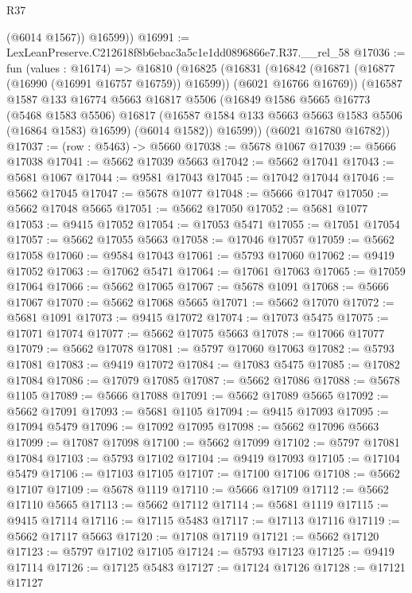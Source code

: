 \begin{lexlean}{R37}
\begin{coremodule}
          (@6014 @1567))
        @16599))
@16991 := LexLeanPreserve.C212618f8b6ebac3a5c1e1dd0896866e7.R37.__rel_58
@17036 := fun (values : @16174) =>
  @16810
    (@16825
      (@16831
        (@16842 (@16871 (@16877 (@16990 (@16991 @16757 @16759)) @16599)) (@6021 @16766 @16769))
        (@16587
          @1587
          @133
          @16774
          @5663
          @16817
          @5506
          (@16849
            @1586
            @5665
            @16773
            (@5468 @1583 @5506)
            @16817
            (@16587 @1584 @133 @5663 @5663 @1583 @5506 (@16864 @1583) @16599)
            (@6014 @1582))
          @16599))
      (@6021 @16780 @16782))
@17037 := (row : @5463) -> @5660
@17038 := @5678 @1067
@17039 := @5666 @17038
@17041 := @5662 @17039 @5663
@17042 := @5662 @17041
@17043 := @5681 @1067
@17044 := @9581 @17043
@17045 := @17042 @17044
@17046 := @5662 @17045
@17047 := @5678 @1077
@17048 := @5666 @17047
@17050 := @5662 @17048 @5665
@17051 := @5662 @17050
@17052 := @5681 @1077
@17053 := @9415 @17052
@17054 := @17053 @5471
@17055 := @17051 @17054
@17057 := @5662 @17055 @5663
@17058 := @17046 @17057
@17059 := @5662 @17058
@17060 := @9584 @17043
@17061 := @5793 @17060
@17062 := @9419 @17052
@17063 := @17062 @5471
@17064 := @17061 @17063
@17065 := @17059 @17064
@17066 := @5662 @17065
@17067 := @5678 @1091
@17068 := @5666 @17067
@17070 := @5662 @17068 @5665
@17071 := @5662 @17070
@17072 := @5681 @1091
@17073 := @9415 @17072
@17074 := @17073 @5475
@17075 := @17071 @17074
@17077 := @5662 @17075 @5663
@17078 := @17066 @17077
@17079 := @5662 @17078
@17081 := @5797 @17060 @17063
@17082 := @5793 @17081
@17083 := @9419 @17072
@17084 := @17083 @5475
@17085 := @17082 @17084
@17086 := @17079 @17085
@17087 := @5662 @17086
@17088 := @5678 @1105
@17089 := @5666 @17088
@17091 := @5662 @17089 @5665
@17092 := @5662 @17091
@17093 := @5681 @1105
@17094 := @9415 @17093
@17095 := @17094 @5479
@17096 := @17092 @17095
@17098 := @5662 @17096 @5663
@17099 := @17087 @17098
@17100 := @5662 @17099
@17102 := @5797 @17081 @17084
@17103 := @5793 @17102
@17104 := @9419 @17093
@17105 := @17104 @5479
@17106 := @17103 @17105
@17107 := @17100 @17106
@17108 := @5662 @17107
@17109 := @5678 @1119
@17110 := @5666 @17109
@17112 := @5662 @17110 @5665
@17113 := @5662 @17112
@17114 := @5681 @1119
@17115 := @9415 @17114
@17116 := @17115 @5483
@17117 := @17113 @17116
@17119 := @5662 @17117 @5663
@17120 := @17108 @17119
@17121 := @5662 @17120
@17123 := @5797 @17102 @17105
@17124 := @5793 @17123
@17125 := @9419 @17114
@17126 := @17125 @5483
@17127 := @17124 @17126
@17128 := @17121 @17127

\end{coremodule}
\end{lexlean}
